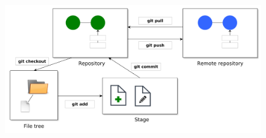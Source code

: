 \documentclass[12pt]{report}
\begin{document}
\begin{figure}[h!]
	\centering
	\includegraphics[width=1.0\textwidth]{../visualizations/chapter5/51_stages_including_remote.pdf}
	\label{fig:all_stages_visualized}
\end{figure}

\end{document}
